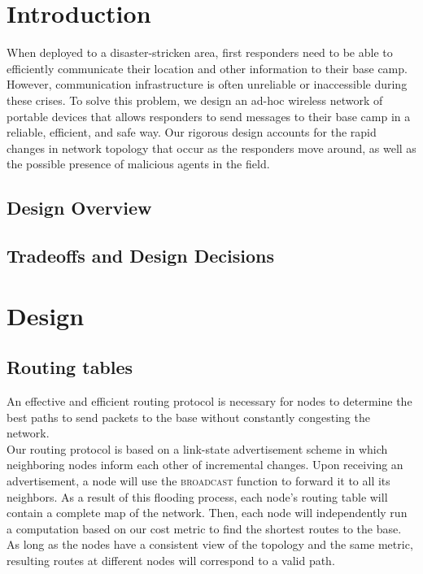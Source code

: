 \documentclass[letterpaper]{article}
\begin{document}
\section{Introduction}

When deployed to a disaster-stricken area, first responders need to be able to efficiently communicate their
location and other information to their base camp. However, communication infrastructure is often unreliable
or inaccessible during these crises. To solve this problem, we design an ad-hoc wireless network of portable
devices that allows responders to send messages to their base camp in a reliable, efficient, and safe way.
Our rigorous design accounts for the rapid changes in network topology that occur as the responders move 
around, as well as the possible presence of malicious agents in the field. 

\subsection{Design Overview}

\subsection{Tradeoffs and Design Decisions}

\section{Design}

\subsection{Routing tables}

An effective and efficient routing protocol is necessary for nodes to determine the best paths to send
packets to the base without constantly congesting the network.
\\

\noindent Our routing protocol is based on a link-state advertisement scheme in which neighboring nodes 
inform each other of incremental changes. Upon receiving an advertisement, a node will use the 
\textsc{broadcast} function to forward it to all its neighbors. As a result of this flooding process,
each node's routing table will contain a complete map of the network. Then, each node will independently
run a computation based on our cost metric to find the shortest routes to the base. As long as the nodes
have a consistent view of the topology and the same metric, resulting routes at different nodes will
correspond to a valid path.
\\
\end{document}
